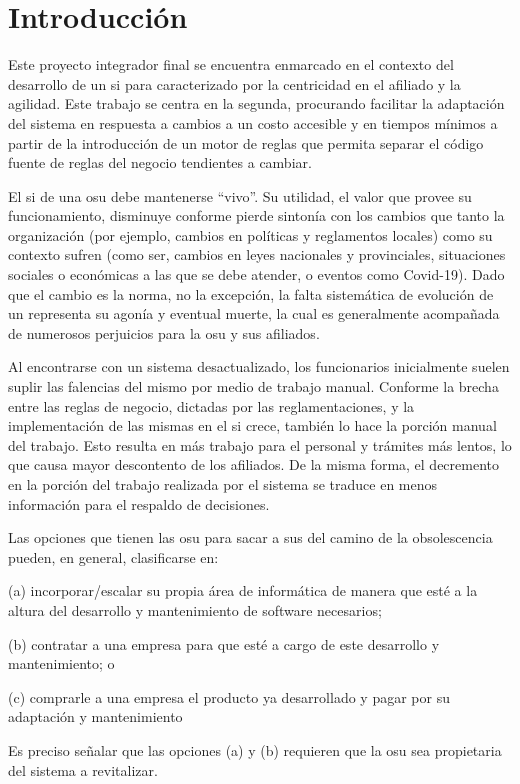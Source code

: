 \section{Introducción}

Este proyecto integrador final se encuentra enmarcado en el contexto del desarrollo de un \acrfull{si} para  caracterizado por la centricidad en el afiliado y la agilidad. Este trabajo se centra en la segunda, procurando facilitar la adaptación del sistema en respuesta a cambios a un costo accesible y en tiempos mínimos a partir de la introducción de un motor de reglas que permita separar el código fuente de reglas del negocio tendientes a cambiar.

El \acrshort{si} de una \acrshort{osu} debe mantenerse ``vivo''. 
Su utilidad, el valor que provee su funcionamiento, disminuye conforme pierde sintonía con los cambios que tanto la organización (por ejemplo, cambios en políticas y reglamentos locales) como su contexto sufren (como ser, cambios en leyes nacionales y provinciales, situaciones sociales o económicas a las que se debe atender, o eventos como Covid-19).
Dado que el cambio es la norma, no la excepción, la falta sistemática de evolución de un {\SIOSU} representa su agonía y eventual muerte, la cual es generalmente acompañada de numerosos perjuicios para la \acrshort{osu} y sus afiliados.

Al encontrarse con un sistema desactualizado, los funcionarios inicialmente suelen suplir las falencias del mismo por medio de trabajo manual. Conforme la brecha entre las reglas de negocio, dictadas por las reglamentaciones, y la implementación de las mismas en el \acrshort{si} crece, también lo hace la porción manual del trabajo. Esto resulta en más trabajo para el personal y trámites más lentos, lo que causa mayor descontento de los afiliados. De la misma forma, el decremento en la porción del trabajo realizada por el sistema se traduce en menos información para el respaldo de decisiones.

Las opciones que tienen las \acrshort{osu} para sacar a sus  del camino de la obsolescencia pueden, en general, clasificarse en:
\begin{enumerate*}
    \item [(a)] incorporar/escalar su propia área de informática de manera que esté a la altura del desarrollo y mantenimiento de software necesarios;
    \item [(b)] contratar a una empresa para que esté a cargo de este desarrollo y mantenimiento; o
    \item [(c)] comprarle a una empresa el producto ya desarrollado y pagar por su adaptación y mantenimiento 
\end{enumerate*} 
Es preciso señalar que las opciones (a) y (b) requieren que la \acrshort{osu} sea propietaria del sistema a revitalizar.

